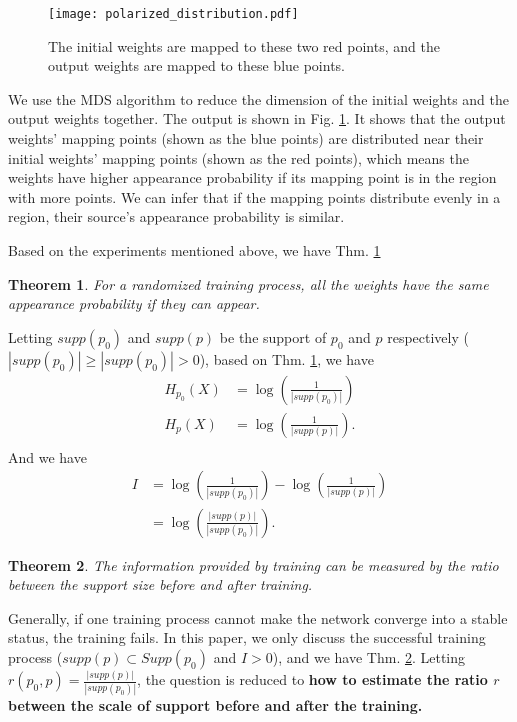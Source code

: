 \documentclass[letterpaper]{article} %
\newtheorem{theorem}{Theorem}
\begin{document}
\begin{figure}[htb]
    \centering
     \texttt{[image: polarized\_distribution.pdf]}
    \caption{The initial weights are mapped to these two red points, and the output weights are mapped to these blue points.}
    \label{MDS_fig_polarized}
\end{figure}
We use the MDS algorithm to reduce the dimension of the initial weights and the output weights together. The output is shown in Fig. \ref{MDS_fig_polarized}. It shows that the output weights' mapping points (shown as the blue points) are distributed near their initial weights' mapping points (shown as the red points), which means the weights have higher appearance probability if its mapping point is in the region with more points. We can infer that if the mapping points distribute evenly in a region, their source's appearance probability is similar.

Based on the experiments mentioned above, we have Thm. \ref{even_distribution}
\begin{theorem}
    For a randomized training process, all the weights have the same appearance probability if they can appear.
    \label{even_distribution}
\end{theorem}

Letting $supp(p_0)$ and $supp(p)$ be the support of $p_0$ and $p$ respectively ($|supp(p_0)| \geq |supp(p_0)| > 0$), based on Thm. \ref{even_distribution}, we have
\begin{align*}
    H_{p_0}(X) &=  \log(\frac{1}{|supp(p_0)|}) \\
    H_{p}(X)  &=  \log(\frac{1}{|supp(p)|}). \\
\end{align*}
And we have
\begin{align*}
    I &= \log(\frac{1}{|supp(p_0)|}) - \log(\frac{1}{|supp(p)|}) \\
    &= \log (\frac{|supp(p)|}{|supp(p_0)|}).
\end{align*}

\begin{theorem}
\label{support_set_size}
    The information provided by training can be measured by the ratio between the support size before and after training.
\end{theorem}

Generally, if one training process cannot make the network converge into a stable status, the training fails. In this paper, we only discuss the successful training process ($supp(p) \subset Supp(p_0)$ and $I > 0$), and we have Thm. \ref{support_set_size}. Letting $r(p_0,p) = \frac{|supp(p)|}{|supp(p_0)|}$, the question is reduced to \textbf{how to estimate the ratio $r$ between the scale of support before and after the training.}
\end{document}
